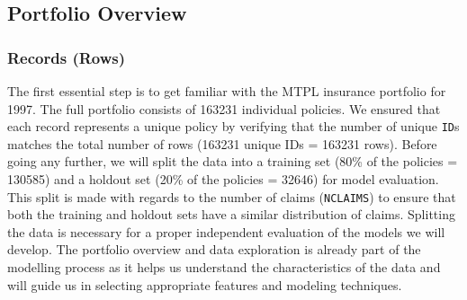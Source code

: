 \documentclass[
  english,
  11pt,
]{article}
\newenvironment{Shaded}{\begin{snugshade}}{\end{snugshade}}
\newcommand{\AttributeTok}[1]{\textcolor[rgb]{0.13,0.29,0.53}{#1}}
\newcommand{\CommentTok}[1]{\textcolor[rgb]{0.56,0.35,0.01}{\textit{#1}}}
\newcommand{\ConstantTok}[1]{\textcolor[rgb]{0.56,0.35,0.01}{#1}}
\newcommand{\DecValTok}[1]{\textcolor[rgb]{0.00,0.00,0.81}{#1}}
\newcommand{\FloatTok}[1]{\textcolor[rgb]{0.00,0.00,0.81}{#1}}
\newcommand{\FunctionTok}[1]{\textcolor[rgb]{0.13,0.29,0.53}{\textbf{#1}}}
\newcommand{\NormalTok}[1]{#1}
\newcommand{\OtherTok}[1]{\textcolor[rgb]{0.56,0.35,0.01}{#1}}
\newcommand{\SpecialCharTok}[1]{\textcolor[rgb]{0.81,0.36,0.00}{\textbf{#1}}}
\newcommand{\StringTok}[1]{\textcolor[rgb]{0.31,0.60,0.02}{#1}}
\begin{document}
\subsection{Portfolio Overview}\label{portfolio-overview}

\subsubsection{Records (Rows)}\label{records-rows}

\begin{Shaded}
\end{Shaded}

The first essential step is to get familiar with the MTPL insurance
portfolio for 1997. The full portfolio consists of 163231 individual
policies. We ensured that each record represents a unique policy by
verifying that the number of unique \texttt{ID}s matches the total
number of rows (163231 unique IDs = 163231 rows). Before going any
further, we will split the data into a training set (80\% of the
policies = 130585) and a holdout set (20\% of the policies = 32646) for
model evaluation. This split is made with regards to the number of
claims (\texttt{NCLAIMS}) to ensure that both the training and holdout
sets have a similar distribution of claims. Splitting the data is
necessary for a proper independent evaluation of the models we will
develop. The portfolio overview and data exploration is already part of
the modelling process as it helps us understand the characteristics of
the data and will guide us in selecting appropriate features and
modeling techniques.
\end{document}
